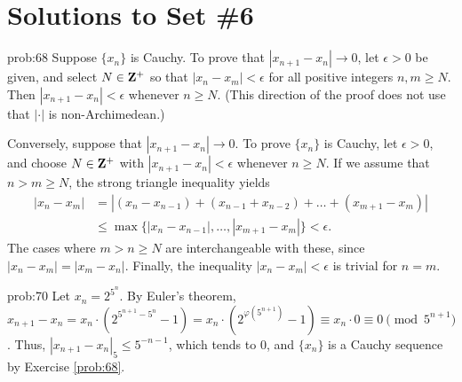 
\chapter*{Solutions to Set \#6}
\label{set5sols}


\begin{sol}{prob:68} Suppose $\{x_n\}$ is Cauchy. To prove that $|x_{n+1}-x_n|\to 0$, let $\epsilon > 0$ be given, and select $N \in \mathbf{Z}^{+}$ so that $|x_n-x_m| < \epsilon$ for all positive integers $n,m \ge N$. Then $|x_{n+1}-x_n| < \epsilon$ whenever $n\ge N$. (This direction of the proof does not use that $|\cdot|$ is non-Archimedean.)

Conversely, suppose that $|x_{n+1}-x_n| \to 0$. To prove $\{x_n\}$ is Cauchy, let $\epsilon > 0$, and choose $N \in \mathbf{Z}^{+}$ with $|x_{n+1}-x_n| < \epsilon$ whenever $n\ge N$. If we assume that $n > m \ge N$, the strong triangle inequality yields
\begin{align*} |x_n - x_m| &= |(x_n - x_{n-1}) + (x_{n-1} + x_{n-2}) + \dots + (x_{m+1}-x_m)|
\\&\le \max\{|x_n-x_{n-1}|,\dots,|x_{m+1}-x_m|\} < \epsilon.\end{align*}
The cases where $m > n \ge N$ are interchangeable with these, since $|x_n-x_m| = |x_m-x_n|$. Finally, the inequality $|x_n-x_m| < \epsilon$ is trivial for $n=m$.
\end{sol}


\begin{sol}{prob:70} Let $x_n = 2^{5^n}$. By Euler's theorem, $x_{n+1}-x_n = x_n\cdot (2^{5^{n+1}-5^{n}}-1) = x_n \cdot (2^{\varphi(5^{n+1})}-1) \equiv x_n \cdot 0\equiv 0\pmod{5^{n+1}}$. Thus,  $|x_{n+1}-x_n|_5 \le 5^{-n-1}$, which tends to $0$, and $\{x_n\}$ is a Cauchy sequence by Exercise \ref{prob:68}.
\end{sol}

